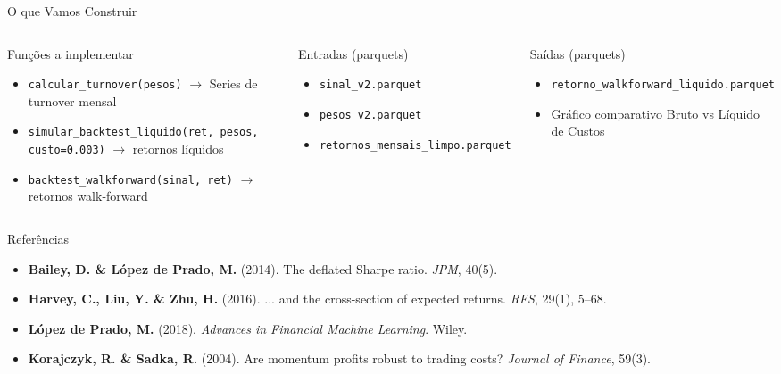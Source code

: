 \documentclass[aspectratio=169,12pt]{beamer}
\begin{document}
\begin{frame}[fragile]{O que Vamos Construir}
\begin{columns}[T]
\begin{block}{Funções a implementar}
\begin{itemize}
  \item \texttt{calcular\_turnover(pesos)} $\to$ Series de turnover mensal
  \item \texttt{simular\_backtest\_liquido(ret, pesos, custo=0.003)} $\to$ retornos líquidos
  \item \texttt{backtest\_walkforward(sinal, ret)} $\to$ retornos walk-forward
\end{itemize}
\end{block}
\begin{block}{Entradas (parquets)}
\begin{itemize}
  \item \texttt{sinal\_v2.parquet}
  \item \texttt{pesos\_v2.parquet}
  \item \texttt{retornos\_mensais\_limpo.parquet}
\end{itemize}
\end{block}
\vspace{.4em}
\begin{exampleblock}{Saídas (parquets)}
\begin{itemize}
  \item \texttt{retorno\_walkforward\_liquido.parquet}
  \item Gráfico comparativo Bruto vs Líquido de Custos
\end{itemize}
\end{exampleblock}
\end{columns}
\end{frame}

\begin{frame}[fragile]{Referências}
\begin{multicols}{2}
\tiny
\begin{itemize}
  \item \textbf{Bailey, D. \& López de Prado, M.} (2014). The deflated Sharpe ratio. \textit{JPM}, 40(5).
  \item \textbf{Harvey, C., Liu, Y. \& Zhu, H.} (2016). ... and the cross-section of expected returns. \textit{RFS}, 29(1), 5--68.
  \item \textbf{López de Prado, M.} (2018). \textit{Advances in Financial Machine Learning}. Wiley.
  \item \textbf{Korajczyk, R. \& Sadka, R.} (2004). Are momentum profits robust to trading costs? \textit{Journal of Finance}, 59(3).
\end{itemize}
\end{multicols}
\end{frame}
\end{document}
